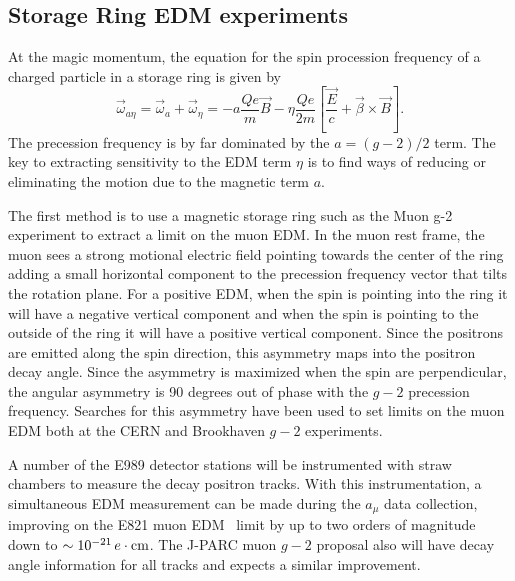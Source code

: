 \subsection{Storage Ring EDM experiments}

At the magic momentum, the equation for the spin procession frequency of a charged particle in a storage ring is given by
\begin{equation}
\vec{\omega}_{a\eta}= \vec \omega_a + \vec \omega_\eta = -
 a \frac {Qe}  {m}
 \vec{B}
 -  \eta \frac {Qe}{2m}
 \left[ \frac {\vec{E}} {c}  +  \vec{\beta} \times \vec{B} \right] .
 \label{eq:omegaa-edm1}
\end{equation}
The precession frequency is by far dominated by the $a= (g-2)/2$ term.  
The key to extracting sensitivity to the EDM term $\eta$ is to find ways of reducing or eliminating the motion due to the magnetic term $a$. 

The first method is to use a magnetic storage ring such as the Muon g-2 experiment to extract a 
limit on the muon EDM.  In the muon rest frame, the muon sees a strong motional electric field
 pointing towards the center of the ring adding a small horizontal component to the precession 
 frequency vector that tilts the rotation plane.  For a positive EDM, when the spin is pointing into the 
 ring it will have a negative vertical component and when the spin is pointing to the outside of the ring 
 it will have a positive vertical component.  Since the positrons are emitted along the spin direction, 
 this asymmetry maps into the positron decay angle. Since the asymmetry is maximized when the spin 
 are perpendicular, the angular asymmetry is 90 degrees out of phase with the $g-2$ precession frequency.  
Searches for this asymmetry have been used to set limits on the muon EDM both at the CERN and Brookhaven $g-2$ experiments. 

 A number of the E989 detector stations will
be instrumented with straw chambers to measure the decay positron
tracks. With this instrumentation, a simultaneous EDM
measurement can be made during the $a_\mu$ data collection,
improving on the  E821 muon EDM~\cite{Bennett08-edm}
 limit by up to two orders of magnitude down to
$\sim 10^{-21}\,  e \cdot {\rm cm}$.   The J-PARC muon $g-2$ proposal also
 will have decay angle information for all tracks and expects a similar improvement.

